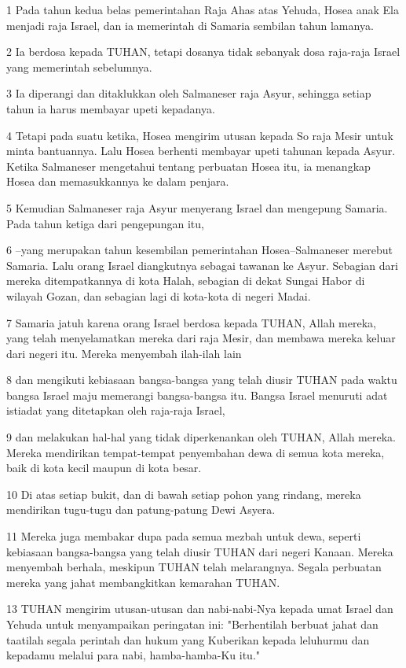 \par 1 Pada tahun kedua belas pemerintahan Raja Ahas atas Yehuda, Hosea anak Ela menjadi raja Israel, dan ia memerintah di Samaria sembilan tahun lamanya.
\par 2 Ia berdosa kepada TUHAN, tetapi dosanya tidak sebanyak dosa raja-raja Israel yang memerintah sebelumnya.
\par 3 Ia diperangi dan ditaklukkan oleh Salmaneser raja Asyur, sehingga setiap tahun ia harus membayar upeti kepadanya.
\par 4 Tetapi pada suatu ketika, Hosea mengirim utusan kepada So raja Mesir untuk minta bantuannya. Lalu Hosea berhenti membayar upeti tahunan kepada Asyur. Ketika Salmaneser mengetahui tentang perbuatan Hosea itu, ia menangkap Hosea dan memasukkannya ke dalam penjara.
\par 5 Kemudian Salmaneser raja Asyur menyerang Israel dan mengepung Samaria. Pada tahun ketiga dari pengepungan itu,
\par 6 --yang merupakan tahun kesembilan pemerintahan Hosea--Salmaneser merebut Samaria. Lalu orang Israel diangkutnya sebagai tawanan ke Asyur. Sebagian dari mereka ditempatkannya di kota Halah, sebagian di dekat Sungai Habor di wilayah Gozan, dan sebagian lagi di kota-kota di negeri Madai.
\par 7 Samaria jatuh karena orang Israel berdosa kepada TUHAN, Allah mereka, yang telah menyelamatkan mereka dari raja Mesir, dan membawa mereka keluar dari negeri itu. Mereka menyembah ilah-ilah lain
\par 8 dan mengikuti kebiasaan bangsa-bangsa yang telah diusir TUHAN pada waktu bangsa Israel maju memerangi bangsa-bangsa itu. Bangsa Israel menuruti adat istiadat yang ditetapkan oleh raja-raja Israel,
\par 9 dan melakukan hal-hal yang tidak diperkenankan oleh TUHAN, Allah mereka. Mereka mendirikan tempat-tempat penyembahan dewa di semua kota mereka, baik di kota kecil maupun di kota besar.
\par 10 Di atas setiap bukit, dan di bawah setiap pohon yang rindang, mereka mendirikan tugu-tugu dan patung-patung Dewi Asyera.
\par 11 Mereka juga membakar dupa pada semua mezbah untuk dewa, seperti kebiasaan bangsa-bangsa yang telah diusir TUHAN dari negeri Kanaan. Mereka menyembah berhala, meskipun TUHAN telah melarangnya. Segala perbuatan mereka yang jahat membangkitkan kemarahan TUHAN.
\par 13 TUHAN mengirim utusan-utusan dan nabi-nabi-Nya kepada umat Israel dan Yehuda untuk menyampaikan peringatan ini: "Berhentilah berbuat jahat dan taatilah segala perintah dan hukum yang Kuberikan kepada leluhurmu dan kepadamu melalui para nabi, hamba-hamba-Ku itu."
